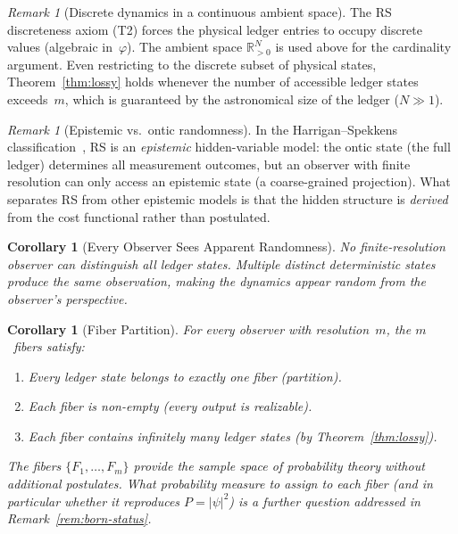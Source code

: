 \documentclass[12pt,a4paper]{article}
\newtheorem{corollary}[theorem]{Corollary}
\theoremstyle{definition}
\theoremstyle{remark}
\newtheorem{remark}[theorem]{Remark}
\begin{document}
\begin{remark}[Discrete dynamics in a continuous ambient space]
The RS discreteness axiom (T2) forces the physical ledger entries to
occupy discrete values (algebraic in~$\varphi$).  The ambient space
$\mathbb{R}_{>0}^N$ is used above for the cardinality argument.  Even
restricting to the discrete subset of physical states, Theorem~\ref{thm:lossy}
holds whenever the number of accessible ledger states exceeds~$m$, which is
guaranteed by the astronomical size of the ledger ($N \gg 1$).
\end{remark}

\begin{remark}[Epistemic vs.\ ontic randomness]
In the Harrigan--Spekkens classification~\cite{Harrigan2010}, RS is an
\emph{epistemic} hidden-variable model: the ontic state (the full
ledger) determines all measurement outcomes, but an observer with
finite resolution can only access an epistemic state (a coarse-grained
projection).  What separates RS from other epistemic models is that the
hidden structure is \emph{derived} from the cost functional rather than
postulated.
\end{remark}

\begin{corollary}[Every Observer Sees Apparent Randomness]
\label{cor:random}
No finite-resolution observer can distinguish all ledger states.  Multiple
distinct deterministic states produce the same observation, making the
dynamics \emph{appear} random from the observer's perspective.
\end{corollary}

\begin{corollary}[Fiber Partition]
\label{cor:fiber}
For every observer with resolution~$m$, the $m$~fibers
satisfy:
\begin{enumerate}[label=(\roman*),nosep]
  \item Every ledger state belongs to exactly one fiber (partition).
  \item Each fiber is non-empty (every output is realizable).
  \item Each fiber contains infinitely many ledger states (by
  Theorem~\ref{thm:lossy}).
\end{enumerate}
The fibers $\{F_1,\ldots,F_m\}$ provide the sample space of probability
theory without additional postulates.  What probability measure to assign to
each fiber (and in particular whether it reproduces $P = |\psi|^2$) is a
further question addressed in Remark~\ref{rem:born-status}.
\end{corollary}
\end{document}
